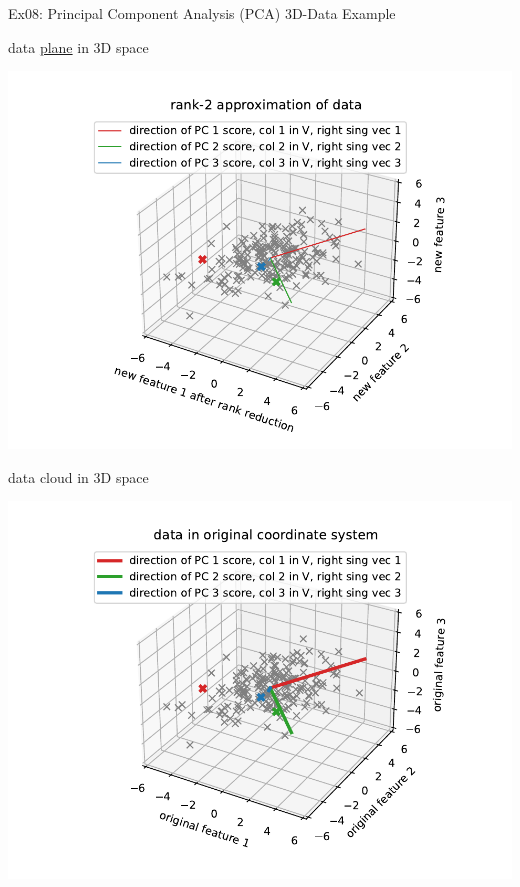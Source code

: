 \documentclass[mathserif, aspectratio=1610]{intbeamer}
\begin{document}
\begin{frame}[t]{Ex08: Principal Component Analysis (PCA) 3D-Data Example}
\begin{minipage}[t]{0.49\textwidth}
data \underline{plane} in 3D space

\includegraphics[width=\textwidth]{pca_3d_truncated_svd.pdf}
\end{minipage}
%
\begin{minipage}[t]{0.49\textwidth}
data cloud in 3D space

\includegraphics[width=\textwidth]{pca_3d_original_data_with_pcdir.pdf}
\end{minipage}
\end{frame}
\end{document}
